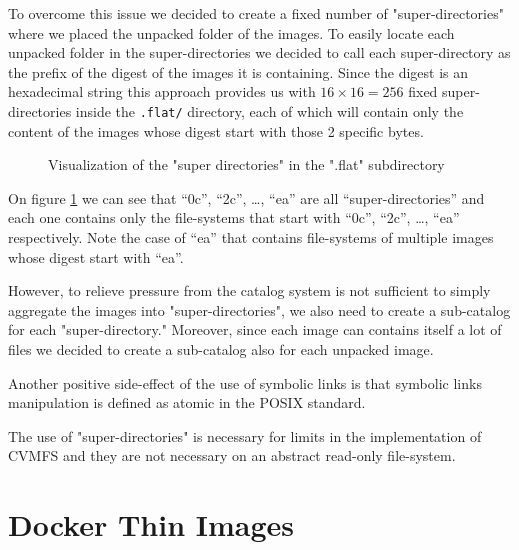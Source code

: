 To overcome this issue we decided to create a fixed number of
"super-directories" where we placed the unpacked folder of the images.  To
easily locate each unpacked folder in the super-directories we decided to call
each super-directory as the prefix of the digest of the images it is
containing. Since the digest is an hexadecimal string this approach provides us
with $16 \times 16 = 256$ fixed super-directories inside the \texttt{.flat/}
directory, each of which will contain only the content of the images whose
digest start with those 2 specific bytes.

\begin{figure}
\caption{Visualization of the "super directories" in the ".flat" subdirectory}
\label{fig:super-directories}
\end{figure}

On figure \ref{fig:super-directories} we can see that “0c”, “2c”, …, “ea” are
all “super-directories” and each one contains only the file-systems that start
with “0c”, “2c”, …, “ea” respectively.  Note the case of “ea” that contains
file-systems of multiple images whose digest start with “ea”.

However, to relieve pressure from the catalog system is not sufficient to
simply aggregate the images into "super-directories", we also need to create a
sub-catalog for each "super-directory." Moreover, since each image can contains
itself a lot of files we decided to create a sub-catalog also for each unpacked
image.

Another positive side-effect of the use of symbolic links is that symbolic
links manipulation is defined as atomic in the POSIX standard.

The use of "super-directories" is necessary for limits in the implementation of
CVMFS and they are not necessary on an abstract read-only file-system.

\section{Docker Thin Images}
\label{sec:methodology-docker}

